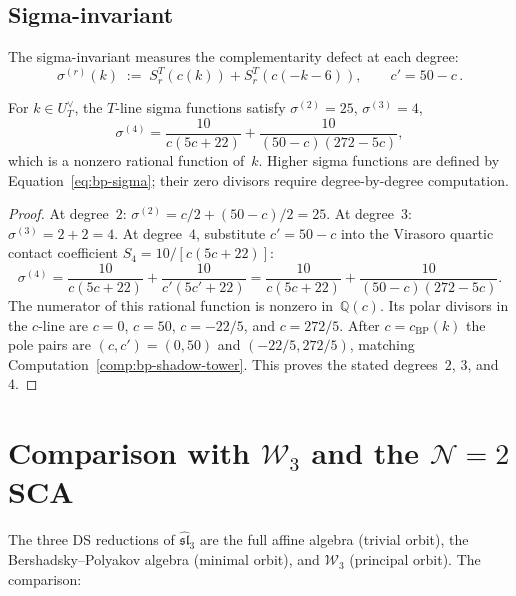 \subsection{Sigma-invariant}

The sigma-invariant measures the complementarity defect at each
degree:
\begin{equation}\label{eq:bp-sigma}
\sigma^{(r)}(k) \;:=\; S_r^T(c(k)) + S_r^T(c(-k-6)),
\qquad c' = 50 - c\,.
\end{equation}

\begin{proposition}
\label{prop:bp-sigma}
For $k\in U_T^\vee$, the $T$-line sigma functions satisfy
$\sigma^{(2)} = 25$,
$\sigma^{(3)} = 4$,
\[
\sigma^{(4)}
=
\frac{10}{c(5c+22)}
+
\frac{10}{(50-c)(272-5c)},
\]
which is a nonzero rational function of~$k$.  Higher sigma functions
are defined by Equation~\eqref{eq:bp-sigma}; their zero divisors require
degree-by-degree computation.
\end{proposition}

\begin{proof}
At degree~$2$: $\sigma^{(2)} = c/2 + (50-c)/2 = 25$.
At degree~$3$: $\sigma^{(3)} = 2 + 2 = 4$.
At degree~$4$, substitute $c'=50-c$ into the Virasoro quartic
contact coefficient $S_4=10/[c(5c+22)]$:
\[
\sigma^{(4)}
=\frac{10}{c(5c+22)}
 +\frac{10}{c'(5c'+22)}
=\frac{10}{c(5c+22)}
 +\frac{10}{(50-c)(272-5c)}.
\]
The numerator of this rational function is nonzero in~$\mathbb Q(c)$.
Its polar divisors in
the $c$-line are $c=0$, $c=50$, $c=-22/5$, and $c=272/5$. After
$c=c_{\mathrm{BP}}(k)$ the pole pairs are
$(c,c')=(0,50)$ and $(-22/5,272/5)$, matching
Computation~\ref{comp:bp-shadow-tower}.  This proves the stated
degrees~$2$, $3$, and~$4$.
\end{proof}


\section{Comparison with $\mathcal{W}_3$ and the
$\mathcal{N}=2$ SCA}\label{sec:bp-comparison}

The three DS reductions of $\widehat{\mathfrak{sl}}_3$ are the
full affine algebra (trivial orbit), the Bershadsky--Polyakov
algebra (minimal orbit), and $\mathcal{W}_3$ (principal orbit).
The comparison:

